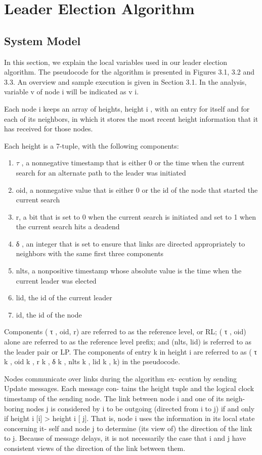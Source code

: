 \chapter{Leader Election Algorithm}

\section{System Model}
In this section, we explain the local variables used in our leader election algorithm. The pseudocode for the algorithm is presented in Figures 3.1, 3.2 and 3.3. An overview and sample execution is given in Section 3.1. In the analysis, variable v of node i will be indicated as v i.

Each node i keeps an array of heights, height i , with an entry for itself and for each of its neighbors, in which it stores the most recent height information that it has received for those nodes.

Each height is a 7-tuple, with the following components:
\begin{enumerate}
\item $\tau$ , a nonnegative timestamp that is either 0 or the time when the current search for an alternate path to the leader was initiated
\item oid, a nonnegative value that is either 0 or the id of the node that started the current search
\item r, a bit that is set to 0 when the current search is initiated and set to 1 when the current search hits a deadend
\item δ , an integer that is set to ensure that links are directed appropriately to neighbors with the same first three components
\item nlts, a nonpositive timestamp whose absolute value is the time when the current leader was elected
\item lid, the id of the current leader
\item id, the id of the node
\end{enumerate}
Components ( τ , oid, r) are referred to as the reference
level, or RL; ( τ , oid) alone are referred to as the reference
level prefix; and (nlts, lid) is referred to as the leader pair
or LP. The components of entry k in height i are referred to
as ( τ k , oid k , r k , δ k , nlts k , lid k , k) in the pseudocode.

Nodes communicate over links during the algorithm ex-
ecution by sending Update messages. Each message con-
tains the height tuple and the logical clock timestamp of the
sending node. The link between node i and one of its neigh-
boring nodes j is considered by i to be outgoing (directed
from i to j) if and only if height i [i] > height i [ j]. That is,
node i uses the information in its local state concerning it-
self and node j to determine (its view of) the direction of the
link to j. Because of message delays, it is not necessarily
the case that i and j have consistent views of the direction
of the link between them.

